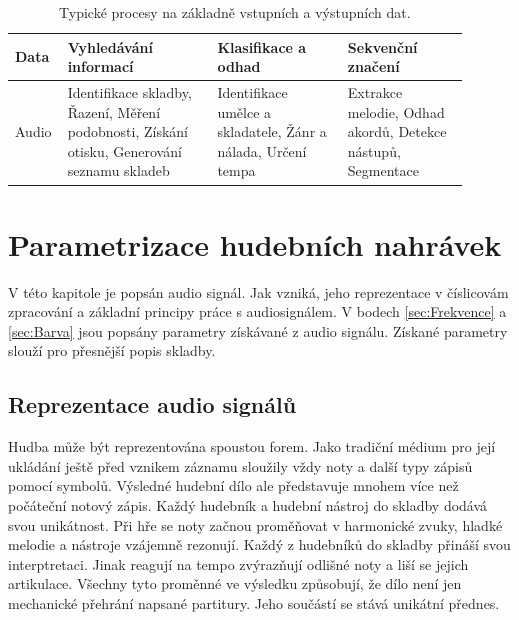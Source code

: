   \begin{table}[H]
    \centering
    \begin{tabular}{|p{0.07\linewidth} | p{0.31\linewidth} | p{0.27\linewidth} | p{0.25\linewidth}|}
        \hline
        {\bf Data}                 & {\bf Vyhledávání informací} & {\bf Klasifikace a odhad} & {\bf Sekvenční značení}\\
        \hline
        Audio                      & Identifikace skladby,
                                     Řazení,
                                     Měření podobnosti,
                                     Získání otisku,
                                     Generování seznamu skladeb
                                   & Identifikace umělce a skladatele,
                                     Žánr a nálada,
                                     Určení tempa
                                   & Extrakce melodie,
                                     Odhad akordů,
                                     Detekce nástupů,
                                     Segmentace                   \\
        \hline
    \end{tabular}
    \caption{Typické procesy na základně vstupních a výstupních dat.}
    \label{tab:MIR_typicke_procesy}
  \end{table}



  \section{Parametrizace hudebních nahrávek}
  V této kapitole je popsán audio signál. Jak vzniká, jeho reprezentace v číslicovám zpracování a základní principy práce s audiosignálem.
  V bodech \ref{sec:Frekvence} a \ref{sec:Barva} jsou popsány parametry získávané z audio signálu. %
  Získané parametry slouží pro přesnější popis skladby. \cite{fundamental_of_music_processing}

  \subsection{Reprezentace audio signálů}
  Hudba může být reprezentována spoustou forem. 
  Jako tradiční médium pro její ukládání ještě před vznikem záznamu sloužily vždy noty a další typy zápisů pomocí symbolů.
  Výsledné hudební dílo ale představuje mnohem více než počáteční notový zápis.
  Každý hudebník a hudební nástroj do skladby dodává svou unikátnost.
  Při hře se noty začnou proměňovat v harmonické zvuky, hladké melodie a nástroje vzájemně rezonují. 
  Každý z hudebníků do skladby přináší svou interptretaci. Jinak reagují na tempo zvýrazňují odlišné noty a liší se jejich artikulace.
  Všechny tyto proměnné ve výsledku způsobují, že dílo není jen mechanické přehrání napsané partitury.
  Jeho součástí se stává unikátní přednes.

